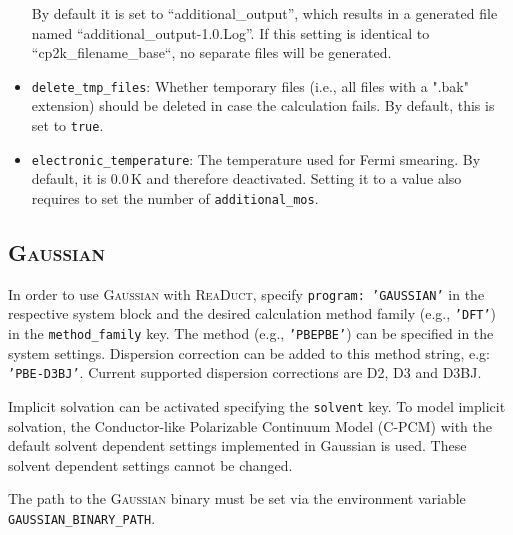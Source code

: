 \documentclass[]{tufte-book}
\begin{document}
\begin{itemize}
	By default it is set to ``additional\_output'', which results in a generated file named ``additional\_output-1.0.Log''. If this setting is identical to ``cp2k\_filename\_base``, no separate files will be generated.
	\item \texttt{delete\_tmp\_files}: Whether temporary files (i.e., all files with a ".bak" extension) should be deleted in case
	the calculation fails. By default, this is set to \texttt{true}.
	\item \texttt{electronic\_temperature}: The temperature used for Fermi smearing. By default, it is 0.0\,K and therefore deactivated. Setting it to a value also requires to set the number of \texttt{additional\_mos}.
\end{itemize}

\subsection{\textsc{Gaussian}}

In order to use \textsc{Gaussian} with \textsc{ReaDuct}, specify \texttt{program: 'GAUSSIAN'} in the respective system block and the desired
calculation method family (e.g., \texttt{'DFT'}) in the \texttt{method\_family} key.
The method (e.g., \texttt{'PBEPBE'}) can be specified in the system settings. Dispersion correction can be added to this method string, e.g: \texttt{'PBE-D3BJ'}. Current supported dispersion corrections are D2, D3\cite{grimmeD3} and D3BJ.\cite{bjDamping}

Implicit solvation can be activated specifying the \texttt{solvent} key.
To model implicit solvation, the Conductor-like Polarizable Continuum Model\cite{cpcm} (C-PCM) with the default solvent dependent settings implemented in Gaussian is used.
These solvent dependent settings cannot be changed.

The path to the \textsc{Gaussian} binary must be set via the environment variable \texttt{GAUSSIAN\_BINARY\_PATH}.
\end{document}
